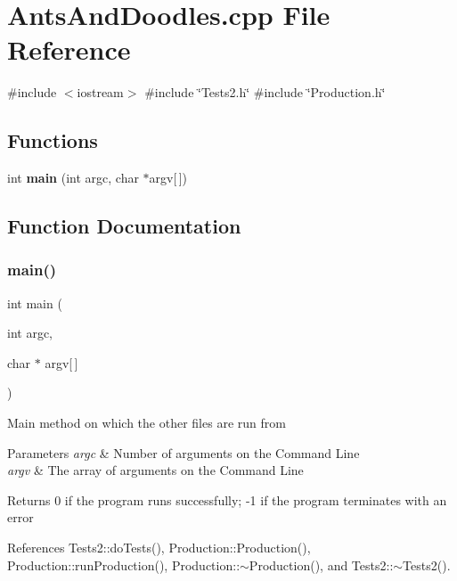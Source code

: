\section{Ants\+And\+Doodles.\+cpp File Reference}
\label{AntsAndDoodles_8cpp}
{\ttfamily \#include $<$iostream$>$}\newline
{\ttfamily \#include \char`\"{}Tests2.\+h\char`\"{}}\newline
{\ttfamily \#include \char`\"{}Production.\+h\char`\"{}}\newline
\subsection*{Functions}
\begin{DoxyCompactItemize}
\item 
int \textbf{ main} (int argc, char $\ast$argv[$\,$])
\end{DoxyCompactItemize}


\subsection{Function Documentation}
\mbox{\label{AntsAndDoodles_8cpp_a0ddf1224851353fc92bfbff6f499fa97}} 
\subsubsection{main()}
{\footnotesize\ttfamily int main (\begin{DoxyParamCaption}\item[{int}]{argc,  }\item[{char $\ast$}]{argv[$\,$] }\end{DoxyParamCaption})}

Main method on which the other files are run from 
\begin{DoxyParams}{Parameters}
{\em argc} & Number of arguments on the Command Line \\
\hline
{\em argv} & The array of arguments on the Command Line \\
\hline
\end{DoxyParams}
\begin{DoxyReturn}{Returns}
0 if the program runs successfully; -\/1 if the program terminates with an error 
\end{DoxyReturn}


References Tests2\+::do\+Tests(), Production\+::\+Production(), Production\+::run\+Production(), Production\+::$\sim$\+Production(), and Tests2\+::$\sim$\+Tests2().

